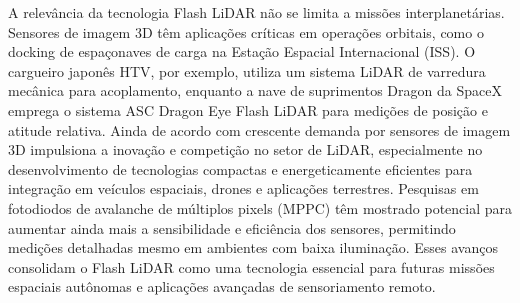 A relevância da tecnologia Flash LiDAR não se limita a missões interplanetárias. Sensores de imagem 3D têm aplicações críticas em operações orbitais, como o docking de espaçonaves de carga na Estação Espacial Internacional (ISS). O cargueiro japonês HTV, por exemplo, utiliza um sistema LiDAR de varredura mecânica para acoplamento, enquanto a nave de suprimentos Dragon da SpaceX emprega o sistema ASC Dragon Eye Flash LiDAR para medições de posição e atitude relativa. Ainda de acordo com \citep{mizuno2020} crescente demanda por sensores de imagem 3D impulsiona a inovação e competição no setor de LiDAR, especialmente no desenvolvimento de tecnologias compactas e energeticamente eficientes para integração em veículos espaciais, drones e aplicações terrestres. Pesquisas em fotodiodos de avalanche de múltiplos pixels (MPPC) têm mostrado potencial para aumentar ainda mais a sensibilidade e eficiência dos sensores, permitindo medições detalhadas mesmo em ambientes com baixa iluminação. Esses avanços consolidam o Flash LiDAR como uma tecnologia essencial para futuras missões espaciais autônomas e aplicações avançadas de sensoriamento remoto.


